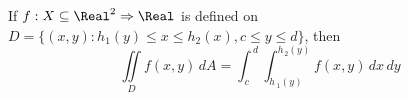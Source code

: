 \begin{theorem}
  If $f : X \subseteq \Real^2 \Rightarrow \Real$ is defined on $D = \{ (x, y) : h_1(y) \leq x \leq h_2(x), c \leq y \leq d \}$, then
  \[
    \iint\limits_{D}{{f\left( {x,y} \right)\,dA}} = \int_{{\,c}}^{{\,d}}{{\int_{{h{\,_1}\left( y \right)}}^{{{h_{\,2}}\left( y \right)}}{{f\left( {x,y} \right)\,dx}}\,dy}}
  \]
\end{theorem}
